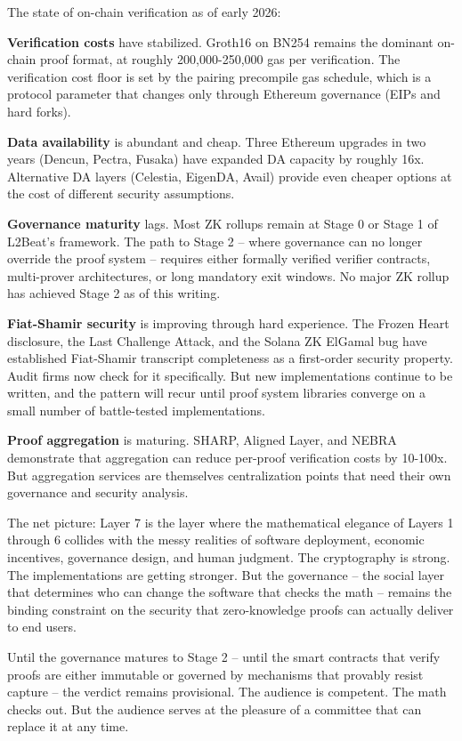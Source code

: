 \documentclass[
  11pt,
  openany]{report}
\renewcommand{\textbf}[1]{{\bfseries\color{MidnightBold}#1}}
\begin{document}
The state of on-chain verification as of early 2026:

\textbf{Verification costs} have stabilized. Groth16 on BN254 remains the
dominant on-chain proof format, at roughly 200,000-250,000 gas per verification.
The verification cost floor is set by the pairing precompile gas schedule, which
is a protocol parameter that changes only through Ethereum governance (EIPs and
hard forks).

\textbf{Data availability} is abundant and cheap. Three Ethereum upgrades in two
years (Dencun, Pectra, Fusaka) have expanded DA capacity by roughly 16x.
Alternative DA layers (Celestia, EigenDA, Avail) provide even cheaper options at
the cost of different security assumptions.

\textbf{Governance maturity} lags. Most ZK rollups remain at Stage 0 or Stage 1
of L2Beat's framework. The path to Stage 2 -- where governance can no longer
override the proof system -- requires either formally verified verifier
contracts, multi-prover architectures, or long mandatory exit windows. No major
ZK rollup has achieved Stage 2 as of this writing.

\textbf{Fiat-Shamir security} is improving through hard experience. The Frozen
Heart disclosure, the Last Challenge Attack, and the Solana ZK ElGamal bug have
established Fiat-Shamir transcript completeness as a first-order security
property. Audit firms now check for it specifically. But new implementations
continue to be written, and the pattern will recur until proof system libraries
converge on a small number of battle-tested implementations.

\textbf{Proof aggregation} is maturing. SHARP, Aligned Layer, and NEBRA
demonstrate that aggregation can reduce per-proof verification costs by 10-100x.
But aggregation services are themselves centralization points that need their
own governance and security analysis.

The net picture: Layer 7 is the layer where the mathematical elegance of Layers
1 through 6 collides with the messy realities of software deployment, economic
incentives, governance design, and human judgment. The cryptography is strong.
The implementations are getting stronger. But the governance -- the social layer
that determines who can change the software that checks the math -- remains the
binding constraint on the security that zero-knowledge proofs can actually
deliver to end users.

Until the governance matures to Stage 2 -- until the smart contracts that verify
proofs are either immutable or governed by mechanisms that provably resist
capture -- the verdict remains provisional. The audience is competent. The math
checks out. But the audience serves at the pleasure of a committee that can
replace it at any time.
\end{document}
